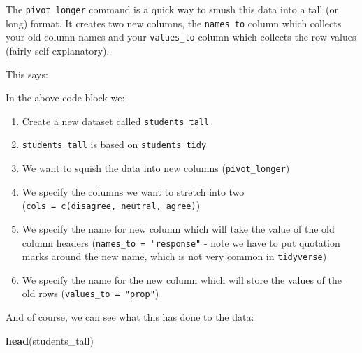 \documentclass[
]{book}
\newenvironment{Shaded}{\begin{snugshade}}{\end{snugshade}}
\newcommand{\DataTypeTok}[1]{\textcolor[rgb]{0.13,0.29,0.53}{#1}}
\newcommand{\KeywordTok}[1]{\textcolor[rgb]{0.13,0.29,0.53}{\textbf{#1}}}
\newcommand{\NormalTok}[1]{#1}
\newcommand{\OperatorTok}[1]{\textcolor[rgb]{0.81,0.36,0.00}{\textbf{#1}}}
\newcommand{\StringTok}[1]{\textcolor[rgb]{0.31,0.60,0.02}{#1}}
\providecommand{\tightlist}{%
  \setlength{\itemsep}{0pt}\setlength{\parskip}{0pt}}
\begin{document}
The \texttt{pivot\_longer} command is a quick way to smush this data into a tall (or long) format. It creates two new columns, the \texttt{names\_to} column which collects your old column names and your \texttt{values\_to} column which collects the row values (fairly self-explanatory).

\begin{Shaded}
\end{Shaded}

This says:

\begin{translate}
In the above code block we:

\begin{enumerate}
.{enumi{enumi}.}
\tightlist
\item
  Create a new dataset called \texttt{students\_tall}
\item
  \texttt{students\_tall} is based on \texttt{students\_tidy}
\item
  We want to squish the data into new columns (\texttt{pivot\_longer})
\item
  We specify the columns we want to stretch into two
  (\texttt{cols\ =\ c(disagree,\ neutral,\ agree)})
\item
  We specify the name for new column which will take the value of the
  old column headers (\texttt{names\_to\ =\ "response"} - note we have
  to put quotation marks around the new name, which is not very common
  in \texttt{tidyverse})
\item
  We specify the name for the new column which will store the values of
  the old rows (\texttt{values\_to\ =\ "prop"})
\end{enumerate}
\end{translate}

And of course, we can see what this has done to the data:

\begin{Shaded}
\begin{Highlighting}[]
\KeywordTok{head}\NormalTok{(students_tall)}
\end{Highlighting}
\end{Shaded}
\end{document}
